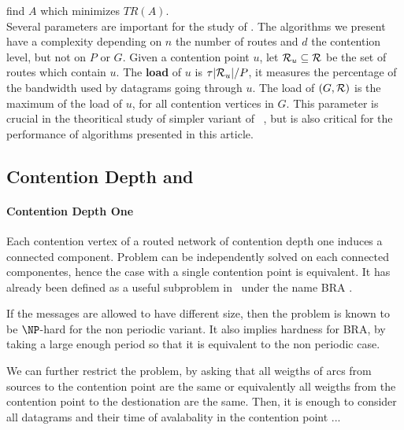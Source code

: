 \documentclass[english]{article}
\begin{document}
       find $A$ which minimizes $TR(A)$.
      \\
    
    Several parameters are important for the study of \spall. The algorithms we present have a complexity
    depending on $n$ the number of routes and $d$ the contention level, but not on $P$ or $G$.
    Given a contention point $u$, let ${\cal R}_u \subseteq {\cal R}$ be the set of routes which contain $u$. The \textbf{load} of $u$ is $\tau|{\cal R}_u|/P$, it measures the percentage of the bandwidth used by datagrams
    going through $u$. The load of $(G,{\cal R})$ is the maximum of the load of $u$, for all contention vertices in $G$.
    This parameter is crucial in the theoritical study of simpler variant of \spall~\cite{guiraud2020scheduling}, but is also critical for the performance of algorithms presented in this article.


\subsection{Contention Depth and \spall}

\paragraph*{Contention Depth One}

Each contention vertex of a routed network of contention depth one induces a connected component. 
Problem \spall can be independently solved on each connected componentes, hence the case with a single contention point
is equivalent. It has already been defined as a useful subproblem in~\cite{barth2018deterministic} under the name BRA .


If the messages are allowed to have different size, then the problem is known to be $\NP$-hard for the non periodic variant.
It also implies hardness for BRA, by taking a large enough period so that it is equivalent to the non periodic case.

We can further restrict the problem, by asking that all weigths of arcs from sources to the contention point
are the same or equivalently all weigths from the contention point to the destionation are the same. 
Then, it is enough to consider all datagrams and their time of avalabality in the contention point ...
\end{document}
